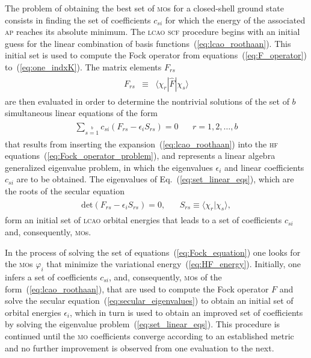 The problem of obtaining the best set of \textsc{mo}s for a
closed-shell ground state consists in finding the set of coefficients
$c_{si}$ for which the energy of the associated \textsc{ap} reaches
its absolute minimum. The \textsc{lcao} \textsc{scf} procedure begins
with an initial guess for the linear combination of basis
functions~(\ref{eq:lcao_roothaan}). This initial set is used to
compute the Fock operator from equations~(\ref{eq:F_operator})
to~(\ref{eq:one_indxK}). The matrix elements $F_{rs}$
%
\begin{eqnarray}
  \begin{split}
    F_{rs} & \equiv & \langle \chi_{r} | \hat{F} | \chi_{s} \rangle
  \end{split}
  \label{eq:F_matrix}
\end{eqnarray}
%
are then evaluated in order to determine the nontrivial solutions of
the set of $b$ simultaneous linear equations of the form
%
\begin{eqnarray}
  \begin{split}
    \sum\limits_{s=1}\limits^{b} c_{si} (F_{rs} - \epsilon_{i}S_{rs}) = 0 &
    ~~~~ r = 1,2,\dots,b
  \end{split}
  \label{eq:set_linear_eqs}
\end{eqnarray}
%
that results from inserting the expansion~(\ref{eq:lcao_roothaan})
into the \textsc{hf} equations~(\ref{eq:Fock_operator_problem}), and
represents a linear algebra generalized eigenvalue problem, in which
the eigenvalues $\epsilon_{i}$ and linear coefficients $c_{si}$ are to
be obtained. The eigenvalues of Eq.~(\ref{eq:set_linear_eqs}), which
are the roots of the secular equation~\cite{Roothaan_HF,Levine_QChem}
%
\begin{eqnarray}
  \begin{split}
    \mathrm{det} (F_{rs} - \epsilon_{i}S_{rs}) = 0, &
    ~~~~ S_{rs} \equiv \langle \chi_{r} | \chi_{s} \rangle,
  \end{split}
  \label{eq:secular_eigenvalues}
\end{eqnarray}
%
form an initial set of \textsc{lcao} orbital energies that leads to a
set of coefficients $c_{si}$ and, consequently, \textsc{mo}s.

In the process of solving the set of
equations~(\ref{eq:Fock_equation}) one looks for the \textsc{mo}s
$\varphi_{i}$ that minimize the variational
energy~(\ref{eq:HF_energy}). Initially, one infers a set of
coefficients $c_{si}$, and, consequently, \textsc{mo}s of the
form~(\ref{eq:lcao_roothaan}), that are used to compute the Fock
operator $F$ and solve the secular
equation~(\ref{eq:secular_eigenvalues}) to obtain an initial set of
orbital energies $\epsilon_{i}$, which in turn is used to obtain an
improved set of coefficients by solving the eigenvalue
problem~(\ref{eq:set_linear_eqs}). This procedure is continued until
the \textsc{mo} coefficients converge according to an established
metric and no further improvement is observed from one evaluation to
the next.

